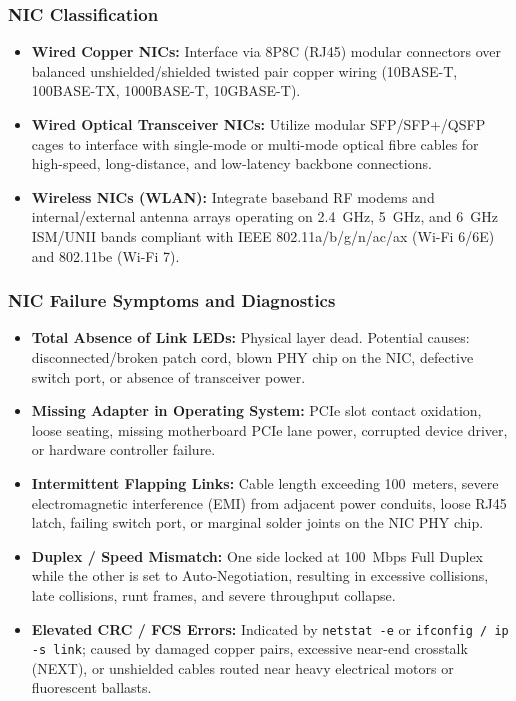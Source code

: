 \subsubsection{NIC Classification}
\begin{itemize}[leftmargin=*]
    \item \textbf{Wired Copper NICs:} Interface via 8P8C (RJ45) modular connectors over balanced unshielded/shielded twisted pair copper wiring (10BASE-T, 100BASE-TX, 1000BASE-T, 10GBASE-T).
    \item \textbf{Wired Optical Transceiver NICs:} Utilize modular SFP/SFP+/QSFP cages to interface with single-mode or multi-mode optical fibre cables for high-speed, long-distance, and low-latency backbone connections.
    \item \textbf{Wireless NICs (WLAN):} Integrate baseband RF modems and internal/external antenna arrays operating on 2.4~GHz, 5~GHz, and 6~GHz ISM/UNII bands compliant with IEEE 802.11a/b/g/n/ac/ax (Wi-Fi 6/6E) and 802.11be (Wi-Fi 7).
\end{itemize}

\subsubsection{NIC Failure Symptoms and Diagnostics}
\begin{itemize}[leftmargin=*]
    \item \textbf{Total Absence of Link LEDs:} Physical layer dead. Potential causes: disconnected/broken patch cord, blown PHY chip on the NIC, defective switch port, or absence of transceiver power.
    \item \textbf{Missing Adapter in Operating System:} PCIe slot contact oxidation, loose seating, missing motherboard PCIe lane power, corrupted device driver, or hardware controller failure.
    \item \textbf{Intermittent Flapping Links:} Cable length exceeding 100~meters, severe electromagnetic interference (EMI) from adjacent power conduits, loose RJ45 latch, failing switch port, or marginal solder joints on the NIC PHY chip.
    \item \textbf{Duplex / Speed Mismatch:} One side locked at 100~Mbps Full Duplex while the other is set to Auto-Negotiation, resulting in excessive collisions, late collisions, runt frames, and severe throughput collapse.
    \item \textbf{Elevated CRC / FCS Errors:} Indicated by \texttt{netstat -e} or \texttt{ifconfig / ip -s link}; caused by damaged copper pairs, excessive near-end crosstalk (NEXT), or unshielded cables routed near heavy electrical motors or fluorescent ballasts.
\end{itemize}

